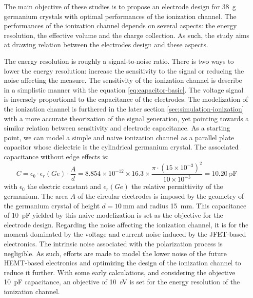 The main objective of these studies is to propose an electrode design for \SI{38}{\g} germanium crystals with optimal performances of the ionization channel. The performances of the ionization channel depends on several aspects: the energy resolution, the effective volume and the charge collection. As such, the study aims at drawing relation between the electrodes design and these aspects.

The energy resolution is roughly a signal-to-noise ratio. There is two ways to lower the energy resolution: increase the sensitivity to the signal or reducing the noise affecting the measure.
The sensitivity of the ionization channel is describe in a simplistic manner with the equation \ref{eq:capacitor-basic}. The voltage signal is inversely proportional to the capacitance of the electrodes. The modelization of the ionization channel is furthered in the later section \ref{sec:simulation-ionization} with a more accurate theorization of the signal generation, yet pointing towards a similar relation between sensitivity and electrode capacitance. As a starting point, we can model a simple and naive ionization channel as a parallel plate capacitor whose dielectric is the cylindrical germanium crystal. The associated capacitance without edge effects is:
\begin{equation}
\label{eq:parrallel-plate-capacitor}
C = \epsilon_0 \cdot \epsilon_r(Ge) \cdot \frac{A}{d}
=
8.854 \times 10^{-12} \times 16.3 \times \frac{\pi \cdot (15 \times 10^{-3})^2}{10 \times 10^{-3}}
=
\SI{10.20}{\pico\farad}
\end{equation}
with $\epsilon_0$ the electric constant and $\epsilon_r(Ge)$ the relative permittivity of the germanium. The area $A$ of the circular electrodes is imposed by the geometry of the germanium crystal of height $d=\SI{10}{\mm}$ and radius \SI{15}{\mm}. This capacitance of \SI{10}{\pico\farad} yielded by this naive modelization is set as the objective for the electrode design. 
Regarding the noise affecting the ionization channel, it is for the moment dominated by the voltage and current noise induced by the JFET-based electronics. The intrinsic noise associated with the polarization process is negligible. As such, efforts are made to model the lower noise of the future HEMT-based electronics and optimizing the design of the ionization channel to reduce it further. With some early calculations, and considering the objective \SI{10}{\pico\farad} capacitance, an objective of \SI{10}{\eV} is set for the energy resolution of the ionization channel.

